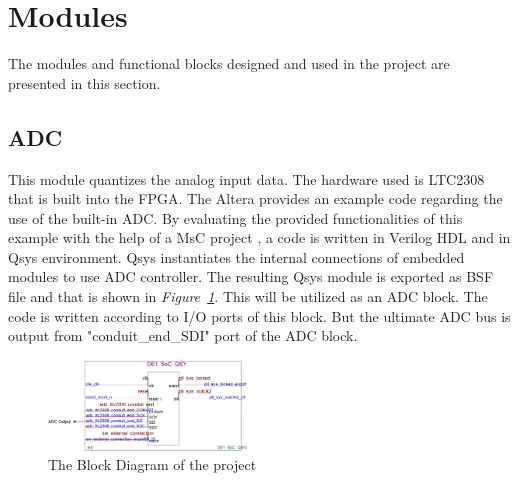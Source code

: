 \documentclass[paper]{IEEEtran}
\begin{document}
\section{Modules}
The modules and functional blocks designed and used in the project are presented in this section.

\subsection{ADC} \- \indent
		This module quantizes the analog input data. The hardware used is LTC2308 that is built into the FPGA. The Altera provides an example code regarding the use of the built-in ADC\cite{b1}. By evaluating the provided functionalities of this example with the help of a MsC project \cite{b2}, a code is written in Verilog HDL and in Qsys environment. Qsys instantiates the internal connections of embedded modules to use ADC controller. The resulting Qsys module is exported as BSF file and that is shown in \textit{Figure~\ref{fig:adc_block}}. This will be utilized as an ADC block. The code is written according to I/O ports of this block. But the ultimate ADC bus is output from "conduit\_end\_SDI" port of the ADC block.
		
		\begin{figure}[t!]
			\setlength{\unitlength}{\textwidth}
			\center 
			\includegraphics[width=0.47\textwidth]{adc_block}
			\caption{\label{fig:adc_block}The Block Diagram of the project}
		\end{figure}
\end{document}
